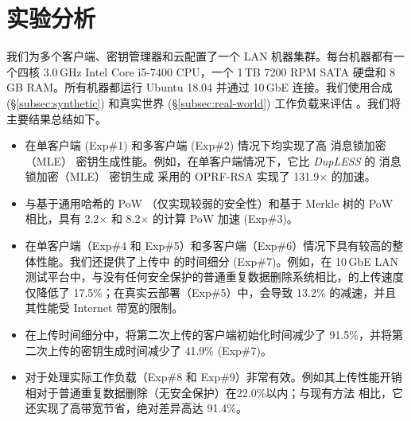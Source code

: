 \section{实验分析}
\label{sec:evaluation}

我们为多个客户端、密钥管理器和云配置了一个 LAN 机器集群。每台机器都有一个四核 3.0\,GHz Intel Core i5-7400 CPU，一个 1\,TB 7200 RPM SATA 硬盘和 8\,GB RAM。所有机器都运行 Ubuntu 18.04 并通过 10\,GbE 连接。我们使用合成 (\S\ref{subsec:synthetic}) 和真实世界 (\S\ref{subsec:real-world}) 工作负载来评估 \sysnameS。我们将主要结果总结如下。

\begin{itemize}[leftmargin=*]
\item \sysnameS 在单客户端 (Exp\#1) 和多客户端 (Exp\#2) 情况下均实现了高 消息锁加密（MLE） 密钥生成性能。例如，在单客户端情况下，它比 {\em DupLESS} 的 消息锁加密（MLE） 密钥生成 \cite{bellare13b} 采用的 OPRF-RSA 实现了 131.9$\times$ 的加速。
\item \sysnameS 与基于通用哈希的 PoW \cite{xu13}（仅实现较弱的安全性）和基于 Merkle 树的 PoW \cite{halevi11} 相比，具有 2.2$\times$ 和 8.2$\times$ 的计算 PoW 加速 (Exp\#3)。
\item \sysnameS 在单客户端（Exp\#4 和 Exp\#5）和多客户端（Exp\#6）情况下具有较高的整体性能。我们还提供了上传中 \sysnameS 的时间细分 (Exp\#7)。例如，在 10\,GbE LAN 测试平台中，与没有任何安全保护的普通重复数据删除系统相比，\sysnameS 的上传速度仅降低了 17.5\%；在真实云部署（Exp\#5）中，\sysnameS 会导致 13.2\% 的减速，并且其性能受 Internet 带宽的限制。
\item 在上传时间细分中，\sysnameS 将第二次上传的客户端初始化时间减少了 91.5\%，并将第二次上传的密钥生成时间减少了 41.9\% (Exp\#7)。
\item \sysnameS 对于处理实际工作负载（Exp\#8 和 Exp\#9）非常有效。例如其上传性能开销相对于普通重复数据删除（无安全保护）在22.0\%以内；与现有方法 \cite{li15,harnik10} 相比，它还实现了高带宽节省，绝对差异高达 91.4\%。
\end{itemize}


